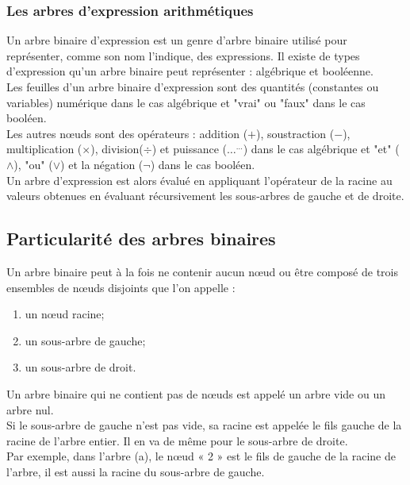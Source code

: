 \documentclass{report}
\begin{document}
\subsubsection{Les arbres d'expression arithmétiques}

Un arbre binaire d'expression est un genre d'arbre binaire utilisé pour représenter, comme son nom l'indique, des expressions. Il existe de types d'expression qu'un arbre binaire peut représenter : algébrique et booléenne.  \\ 
Les feuilles d'un arbre binaire d'expression sont des quantités (constantes ou variables) numérique dans le cas algébrique et "vrai" ou "faux" dans le cas booléen.\\
Les autres nœuds sont des opérateurs : addition ($+$), soustraction ($-$), multiplication ($\times$), division($\div$) et puissance ($\ldots^{\ldots}$) dans le cas algébrique et "et" ($\wedge$), "ou" ($\vee$) et la négation ($\neg$) dans le cas booléen.\\
Un arbre d'expression est alors évalué en appliquant l'opérateur de la racine au valeurs obtenues en évaluant récursivement les sous-arbres de gauche et de droite.

\begin{center}
\end{center}


  
\subsection{Particularité des arbres binaires}

Un arbre binaire peut à la fois ne contenir aucun nœud ou être composé de trois ensembles de nœuds disjoints que l'on appelle :
\begin{enumerate}
\item un nœud racine;
\item un sous-arbre de gauche;
\item un sous-arbre de droit.
\end{enumerate}

Un arbre binaire qui ne contient pas de nœuds est appelé un arbre vide ou un arbre nul.\\
Si le sous-arbre de gauche n'est pas vide, sa racine est appelée le fils gauche de la racine de l'arbre entier. Il en va de même pour le sous-arbre de droite.\\
Par exemple, dans l'arbre (a), le nœud « 2 » est le fils de gauche de la racine de l'arbre, il est aussi la racine du sous-arbre de gauche.
\end{document}
